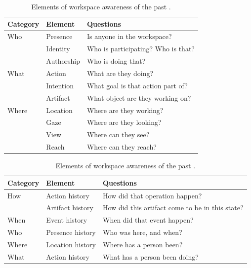    \begin{table}[!ht]
        \centering
        \caption{Elements of workspace awareness of the present \cite{gutwinDescriptiveFrameworkWorkspace2002}.}
        \begin{tabular}{lll}
             \hline
             Category & Element & Questions \\
             \hline
             Who & Presence  & Is anyone in the workspace? \\
             & Identity  & Who is participating? Who is that? \\
             \vspace{0.7em}
            
             & Authorship & Who is doing that? \\
             What & Action & What are they doing? \\
             & Intention & What goal is that action part of? \\
             \vspace{0.7em}
            
             & Artifact & What object are they working on? \\
             Where & Location & Where are they working? \\
             & Gaze & Where are they looking? \\
             & View & Where can they see? \\
             & Reach & Where can they reach? \\
        \end{tabular}
        \vspace{1em}
        
        \label{tab:workspaceElementsPresent}

        \bigskip
        \caption{Elements of workspace awareness of the past \cite{gutwinDescriptiveFrameworkWorkspace2002}.}
        \begin{tabular}{lll}
             \hline
             Category & Element & Questions \\
             \hline
             How & Action history & How did that operation happen? \\
             \vspace{0.7em}
              & Artifact history & How did this artifact come to be in this state? \\
            \vspace{0.7em}
             When & Event history & When did that event happen? \\
             \vspace{0.7em}
             Who & Presence history & Who was here, and when? \\
             \vspace{0.7em}
             Where & Location history & Where has a person been? \\
             \vspace{0.7em}
             What & Action history  & What has a person been doing? \\
            

\end{tabular}
\end{table}
